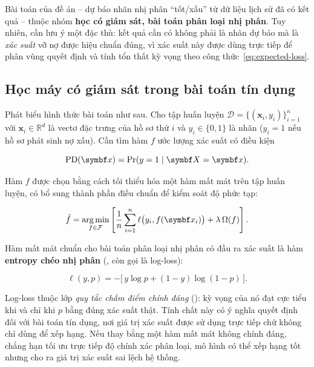 Bài toán của đề án -- dự báo nhãn nhị phân ``tốt/xấu'' từ dữ liệu lịch sử đã có
kết quả -- thuộc nhóm \textbf{học có giám sát, bài toán phân loại nhị phân}. Tuy
nhiên, cần lưu ý một đặc thù: kết quả cần có không phải là nhãn dự báo
mà là \textit{xác suất} vỡ nợ được hiệu chuẩn đúng, vì xác suất này được dùng
trực tiếp để phân vùng quyết định và tính tổn thất kỳ vọng theo
công thức~\eqref{eq:expected-loss}.

\subsection{Học máy có giám sát trong bài toán tín dụng}
\label{subsec:hoc-co-giam-sat}

Phát biểu hình thức bài toán như sau. Cho tập huấn luyện
$\mathcal{D} = \{(\bm{x}_i, y_i)\}_{i=1}^{n}$ với $\bm{x}_i \in \mathbb{R}^d$ là
vectơ đặc trưng của hồ sơ thứ $i$ và $y_i \in \{0, 1\}$ là nhãn ($y_i = 1$ nếu hồ
sơ phát sinh nợ xấu). Cần tìm hàm $f$ ước lượng xác suất có điều kiện

\begin{equation}
\PD(\bm{x}) = \Pr(y = 1 \mid \bm{X} = \bm{x}).
\label{eq:pd-definition}
\end{equation}

Hàm $f$ được chọn bằng cách tối thiểu hóa một hàm mất mát trên tập huấn luyện, có
bổ sung thành phần điều chuẩn để kiểm soát độ phức tạp:

\begin{equation}
\hat{f} = \argmin_{f \in \mathcal{F}}
\left[ \frac{1}{n} \sum_{i=1}^{n} \ell\big(y_i, f(\bm{x}_i)\big)
       + \lambda \, \Omega(f) \right].
\label{eq:erm}
\end{equation}

Hàm mất mát chuẩn cho bài toán phân loại nhị phân có đầu ra xác suất là hàm
\textbf{entropy chéo nhị phân} (, còn gọi là log-loss):

\begin{equation}
\ell(y, p) = -\big[\, y \log p + (1 - y) \log (1 - p) \,\big].
\label{eq:logloss}
\end{equation}

Log-loss thuộc lớp \textit{quy tắc chấm điểm chính đáng} (): kỳ vọng của nó đạt cực tiểu khi và chỉ khi $p$ bằng đúng xác suất
thật. Tính chất này có ý nghĩa quyết định đối với bài toán tín dụng, nơi giá trị
xác suất được sử dụng trực tiếp chứ không chỉ dùng để xếp hạng. Nếu thay bằng một
hàm mất mát không chính đáng, chẳng hạn tối ưu trực tiếp độ chính xác phân loại,
mô hình có thể xếp hạng tốt nhưng cho ra giá trị xác suất sai lệch hệ thống.


